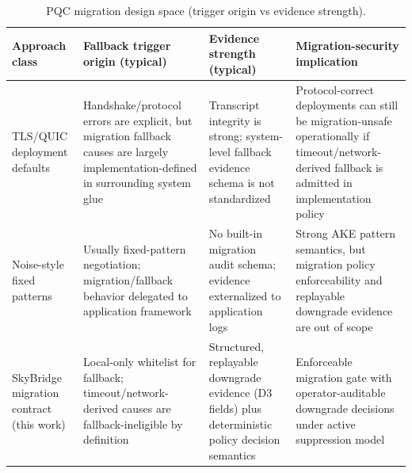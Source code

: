 \begin{table}[!t]
\centering
\scriptsize
\caption{PQC migration design space (trigger origin vs evidence strength).}
\label{tab:migration-design-space}
\begin{tabular}{@{}
  >{\raggedright\arraybackslash}p{}
  >{\raggedright\arraybackslash}p{}
  >{\raggedright\arraybackslash}p{}
  >{\raggedright\arraybackslash}p{}@{}}
\toprule
Approach class & Fallback trigger origin (typical) & Evidence strength (typical) & Migration-security implication \\
\midrule
TLS/QUIC deployment defaults & Handshake/protocol errors are explicit, but migration fallback causes are largely implementation-defined in surrounding system glue & Transcript integrity is strong; system-level fallback evidence schema is not standardized & Protocol-correct deployments can still be migration-unsafe operationally if timeout/network-derived fallback is admitted in implementation policy \\
Noise-style fixed patterns & Usually fixed-pattern negotiation; migration/fallback behavior delegated to application framework & No built-in migration audit schema; evidence externalized to application logs & Strong AKE pattern semantics, but migration policy enforceability and replayable downgrade evidence are out of scope \\
SkyBridge migration contract (this work) & Local-only whitelist for fallback; timeout/network-derived causes are fallback-ineligible by definition & Structured, replayable downgrade evidence (D3 fields) plus deterministic policy decision semantics & Enforceable migration gate with operator-auditable downgrade decisions under active suppression model \\
\bottomrule
\end{tabular}
\end{table}
